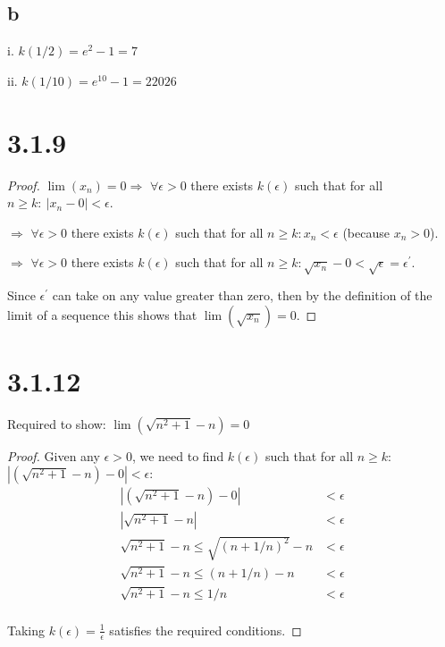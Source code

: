 \documentclass{article}
\begin{document}
\subsection*{b}
i. $k(1/2) = e^2 - 1 = 7$

\noindent
ii. $k(1/10) = e^{10} - 1 = 22026$

\section*{3.1.9}
\begin{proof}
  $\lim(x_n)=0 \Rightarrow$ $\forall \epsilon > 0$ there exists $k(\epsilon)$ such that for all $n \geq k:\ |x_n - 0| < \epsilon$.
  
  \noindent
  $\Rightarrow$ $\forall \epsilon > 0$ there exists $k(\epsilon)$ such that for all $n \geq k: x_n < \epsilon$ (because $x_n > 0$).

  \noindent
  $\Rightarrow$ $\forall \epsilon > 0$ there exists $k(\epsilon)$ such that for all $n \geq k: \sqrt{x_n} - 0< \sqrt{\epsilon} = \epsilon^{'}$.

  \noindent
  Since $\epsilon^{'}$ can take on any value greater than zero, then by the definition of the limit of a sequence this shows that $\lim(\sqrt{x_n})=0$.
  \noindent 

\end{proof}


\section*{3.1.12}
Required to show: $\lim (\sqrt{n^2 + 1} - n) = 0$
\begin{proof}
  Given any $\epsilon > 0$, we need to find $k(\epsilon)$ such that for all $n \geq k$: $|(\sqrt{n^2 + 1} - n) - 0| < \epsilon$:
  \begin{align*}
    |(\sqrt{n^2 + 1} - n) - 0| &< \epsilon \\
    |\sqrt{n^2 + 1} - n| &< \epsilon \\
    \sqrt{n^2 + 1} - n \leq \sqrt{(n + 1/n)^2} - n &< \epsilon \\
    \sqrt{n^2 + 1} - n \leq (n + 1/n) - n &< \epsilon \\
    \sqrt{n^2 + 1} - n \leq 1/n &< \epsilon \\
  \end{align*}

  Taking $k(\epsilon)= \frac{1}{\epsilon}$ satisfies the required conditions.

\end{proof}
\end{document}
